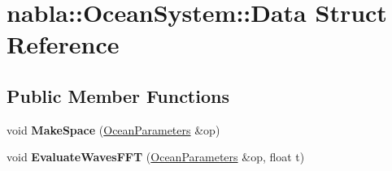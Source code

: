\hypertarget{structnabla_1_1_ocean_system_1_1_data}{}\section{nabla\+::Ocean\+System\+::Data Struct Reference}
\label{structnabla_1_1_ocean_system_1_1_data}
\subsection*{Public Member Functions}
\begin{DoxyCompactItemize}
\item 
\mbox{\label{structnabla_1_1_ocean_system_1_1_data_aad03bbe69cfd34c1eb309b3167d76c20}} 
void {\bfseries Make\+Space} (\mbox{\hyperlink{structnabla_1_1_ocean_parameters}{Ocean\+Parameters}} \&op)
\item 
\mbox{\label{structnabla_1_1_ocean_system_1_1_data_ab4d68ce7a75c31b4d49ffbd428d12188}} 
void {\bfseries Evaluate\+Waves\+F\+FT} (\mbox{\hyperlink{structnabla_1_1_ocean_parameters}{Ocean\+Parameters}} \&op, float t)
\end{DoxyCompactItemize}
